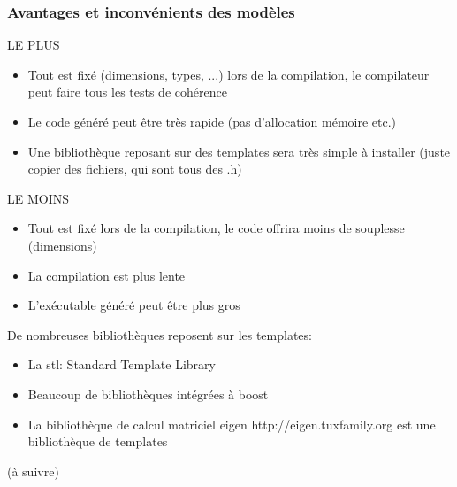 \documentclass{beamer}
\begin{document}
\begin{frame}
\frametitle {Avantages et inconvénients des modèles}

\begin{block}{LE PLUS}
\begin{itemize}
\item{Tout est fixé (dimensions, types, ...) lors de la compilation, le compilateur peut faire tous les tests de cohérence}
\item{Le code généré peut être très rapide (pas d'allocation mémoire etc.)}
\item{Une bibliothèque reposant sur des templates sera très simple à installer (juste copier des fichiers, qui sont tous des .h)}
\end{itemize}
\end{block}

\begin{block}{LE MOINS}
\begin{itemize}
\item{Tout est fixé lors de la compilation, le code offrira moins de souplesse (dimensions)}
\item{La compilation est plus lente}
\item{L'exécutable généré peut être plus gros}
\end{itemize}
\end{block}

De nombreuses bibliothèques reposent sur les templates:
\begin{itemize}
\item{La stl: Standard Template Library}
\item{Beaucoup de bibliothèques intégrées à boost}
\item{La bibliothèque de calcul matriciel eigen http://eigen.tuxfamily.org est une bibliothèque de templates}
\end{itemize}
\end{frame}


\begin{frame}
(à suivre)
\end{frame}
\end{document}
